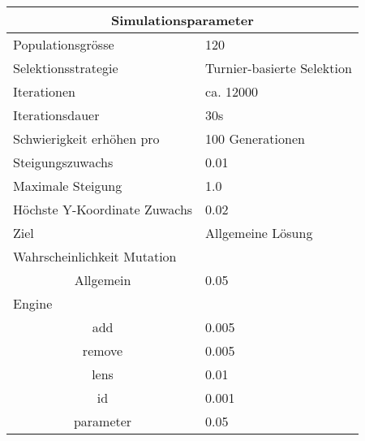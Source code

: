 
\begin{tabular}{ | l | l | }

  \hline
  \multicolumn{2}{|c|}{Simulationsparameter} \\
  \hline
  Populationsgrösse & 120 \\ \hline
  Selektionsstrategie & Turnier-basierte Selektion \\ \hline
  Iterationen & ca. 12000 \\ \hline
  Iterationsdauer & 30s \\ \hline
  Schwierigkeit erhöhen pro & 100 Generationen \\ \hline
  Steigungszuwachs & 0.01 \\ \hline
  Maximale Steigung & 1.0 \\ \hline
  Höchste Y-Koordinate Zuwachs  & 0.02 \\ \hline
  Ziel & Allgemeine Lösung \\ \hline
  \multicolumn{2}{|l|}{Wahrscheinlichkeit Mutation}\\ \hline
  \multicolumn{1}{|c|}{Allgemein} & 0.05 \\ \hline
  Engine &  \\ \hline
  \multicolumn{1}{|c|}{add} & 0.005 \\ \hline
  \multicolumn{1}{|c|}{remove} & 0.005 \\ \hline
  \multicolumn{1}{|c|}{lens} & 0.01 \\ \hline
  \multicolumn{1}{|c|}{id} & 0.001 \\ \hline
  \multicolumn{1}{|c|}{parameter} & 0.05 \\ \hline

\end{tabular}
